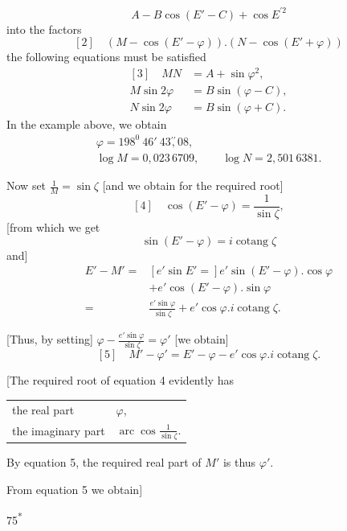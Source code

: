 \[
A-B\cos(E'-C)+\cos E^{\prime2}
\]
into the factors
\[
[2]\quad(M-\cos(E'-\varphi))\mathord{.}(N-\cos(E'+\varphi))
\]
the following equations must be satisfied
\[
\begin{aligned}
{[3]}\quad MN&=A+\sin\varphi^2,\\
M\sin2\varphi&=B\sin(\varphi-C),\\
N\sin2\varphi&=B\sin(\varphi+C).
\end{aligned}
\]
In the example above, we obtain
\[
\begin{gathered}
\varphi=198^0\ 46'\ 43\overset{\prime\prime}{,}08,\\
\log M=0{,}023\,6709,\qquad
\log N=2{,}501\,6381.
\end{gathered}
\]
\par\noindent\hspace*{\parindent}Now set \(\frac1M=\sin\zeta\) [and we obtain for the required root]
\[
[4]\quad\cos(E'-\varphi)=\frac1{\sin\zeta},
\]
[from which we get
\[
\sin(E'-\varphi)=i\operatorname{cotang}\zeta
\]
and]
\[
\begin{aligned}
E'-M'={}&[e'\sin E'=]e'\sin(E'-\varphi)\mathord{.}\cos\varphi\\
&+e'\cos(E'-\varphi)\mathord{.}\sin\varphi\\
={}&\frac{e'\sin\varphi}{\sin\zeta}
  +e'\cos\varphi\mathord{.}i\operatorname{cotang}\zeta.
\end{aligned}
\]
\par\noindent\hspace*{\parindent}[Thus, by setting] \(\varphi-\frac{e'\sin\varphi}{\sin\zeta}=\varphi'\) [we obtain]
\[
[5]\quad M'-\varphi'=E'-\varphi-e'\cos\varphi\mathord{.}i\operatorname{cotang}\zeta.
\]
\par\noindent\hspace*{\parindent}[The required root of equation 4 evidently has
\begin{center}
\begin{tabular}{@{}ll@{}}
the real part & \(\varphi\),\\
the imaginary part & \(\operatorname{arc}\cos\frac1{\sin\zeta}\).\\
\end{tabular}
\end{center}
By equation 5, the required real part of \(M'\) is thus \(\varphi'\).
\par\noindent\hspace*{\parindent}From equation 5 we obtain]
\par\noindent\hfill75\textsuperscript{*}\par
